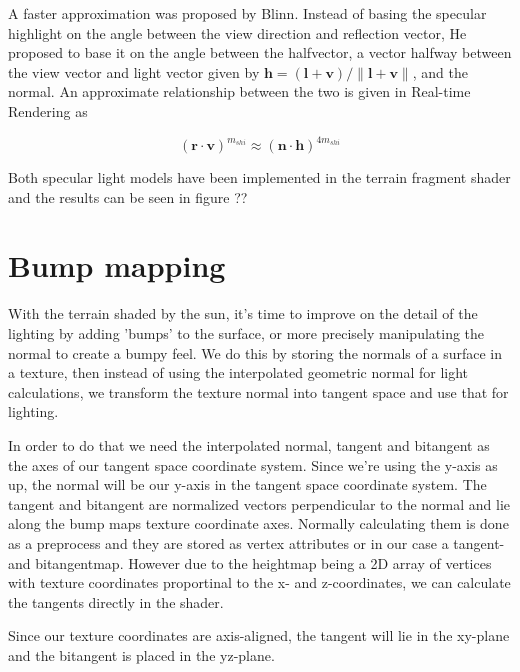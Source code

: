 A faster approximation was proposed by Blinn. Instead of basing the
specular highlight on the angle between the view direction and
reflection vector, He proposed to base it on the angle between the
halfvector, a vector halfway between the view vector and light vector
given by $\mathbf{h} = (\mathbf{l} + \mathbf{v}) / \|\mathbf{l} +
\mathbf{v}\|$, and the normal. An approximate relationship between the
two is given in Real-time Rendering as

\begin{displaymath}
  (\mathbf{r} \cdot \mathbf{v})^{m_{shi}} \approx (\mathbf{n} \cdot \mathbf{h})^{4m_{shi}} 
\end{displaymath}

Both specular light models have been implemented in the terrain
fragment shader and the results can be seen in figure ??



\section{Bump mapping}

With the terrain shaded by the sun, it's time to improve on the detail
of the lighting by adding 'bumps' to the surface, or more precisely
manipulating the normal to create a bumpy feel. We do this by storing
the normals of a surface in a texture, then instead of using the
interpolated geometric normal for light calculations, we transform the
texture normal into tangent space and use that for lighting.

In order to do that we need the interpolated normal, tangent and
bitangent as the axes of our tangent space coordinate system. Since
we're using the y-axis as up, the normal will be our y-axis in the
tangent space coordinate system. The tangent and bitangent are
normalized vectors perpendicular to the normal and lie along the bump
maps texture coordinate axes. Normally calculating them is done as a
preprocess and they are stored as vertex attributes or in our case a
tangent- and bitangentmap. However due to the heightmap being a 2D
array of vertices with texture coordinates proportinal to the x- and
z-coordinates, we can calculate the tangents directly in the shader.

Since our texture coordinates are axis-aligned, the tangent will lie
in the xy-plane and the bitangent is placed in the yz-plane. 



